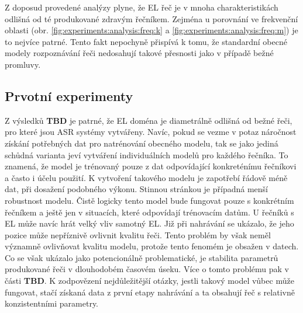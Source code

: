 Z doposud provedené analýzy plyne, že EL řeč je v mnoha charakteristikách odlišná od té produkované zdravým řečníkem. Zejména u porovnání ve frekvenční oblasti (obr. \ref{fig:experiments:analysis:freq:k} a \ref{fig:experiments:analysis:freq:m}) je to nejvíce patrné. Tento fakt nepochyně přispívá k tomu, že standardní obecné modely rozpoznávání řeči nedosahují takové přesnosti jako v případě bežné promluvy.


\subsection{Prvotní experimenty}
\label{chap:experiments:analysis:experiment}

Z výsledků \textbf{TBD} je patrné, že EL doména je diametrálně odlišná od bežné řeči, pro které jsou ASR systémy vytvářeny. Navíc, pokud se vezme v potaz náročnost získání potřebných dat pro natrénování obecného modelu, tak se jako jediná schůdná varianta jeví vytváření individuálních modelů pro každého řečníka. To znamená, že model je trénovaný pouze z dat odpovídající konkreténímu řečníkovi a často i účelu použití. K vytvoření takového modelu je zapotřebí řádově méně dat, při dosažení podobného výkonu. Stinnou stránkou je případná menší robustnost modelu. Čistě logicky tento model bude fungovat pouze s konkrétním řečníkem a ještě jen v situacích, které odpovídají trénovacím datům. U řečníků s EL může navíc hrát velký vliv samotný EL. Již při nahrávání se ukázalo, že jeho pozice může nepříznivě ovlivnit kvalitu řeči. Tento problém by však neměl významně ovlivňovat kvalitu modelu, protože tento fenomém je obsažen v datech. Co se však ukázalo jako potencionálně problematické, je stabilita parametrů produkované řeči v dlouhodobém časovém úseku. Více o tomto problému pak v části \textbf{TBD}. K zodpovězení nejdůležitější otázky, jestli takový model vůbec může fungovat, stačí získaná data z první etapy nahrávání a ta obsahují řeč s relativně konzistentními parametry.

